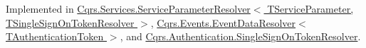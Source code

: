 Implemented in \hyperlink{classCqrs_1_1Services_1_1ServiceParameterResolver_a22a2d6f220b8d2d3eba59e98dc577b43}{Cqrs.\+Services.\+Service\+Parameter\+Resolver$<$ T\+Service\+Parameter, T\+Single\+Sign\+On\+Token\+Resolver $>$}, \hyperlink{classCqrs_1_1Events_1_1EventDataResolver_a62be7cd15bb38f3a4054a62e787c473d}{Cqrs.\+Events.\+Event\+Data\+Resolver$<$ T\+Authentication\+Token $>$}, and \hyperlink{classCqrs_1_1Authentication_1_1SingleSignOnTokenResolver_af474315b8fc66d17d64460fab8c63dd1}{Cqrs.\+Authentication.\+Single\+Sign\+On\+Token\+Resolver}.

